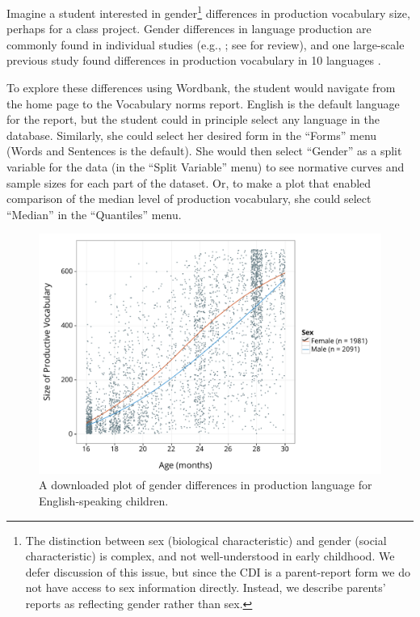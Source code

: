 \documentclass[man,noapacite]{apa}
\begin{document}
Imagine a student interested in gender\footnote{The distinction between sex (biological characteristic) and gender (social characteristic) is complex, and not well-understood in early childhood. We defer discussion of this issue, but since the CDI is a parent-report form we do not have access to sex information directly. Instead, we describe parents' reports as reflecting gender rather than sex.} differences in production vocabulary size, perhaps for a class project. Gender differences in language production are commonly found in individual studies (e.g., ; see  for review), and one large-scale previous study found differences in production vocabulary in 10 languages \cite{eriksson2012}. 

To explore these differences using Wordbank, the student would navigate from the home page to the Vocabulary norms report. English is the default language for the report, but the student could in principle select any language in the database. Similarly, she could select her desired form in the ``Forms'' menu (Words and Sentences is the default). She would then select ``Gender'' as a split variable for the data (in the ``Split Variable'' menu) to see normative curves and sample sizes for each part of the dataset. Or, to make a plot that enabled comparison of the median level of production vocabulary, she could select ``Median'' in the ``Quantiles'' menu. 

\begin{figure}[h!]
\includegraphics[width=6in]{figures/vocabulary_norms.pdf}
\caption{\label{fig:gender1} A downloaded plot of gender differences in production language for English-speaking children.}
\end{figure}
\end{document}
